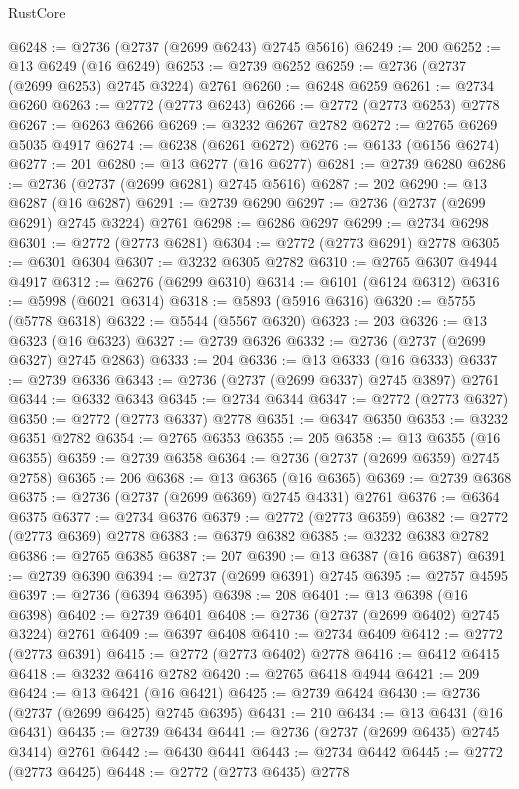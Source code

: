 \begin{lexlean}{RustCore}
\begin{coremodule}
@6248 := @2736 (@2737 (@2699 @6243) @2745 @5616)
@6249 := 200
@6252 := @13 @6249 (@16 @6249)
@6253 := @2739 @6252
@6259 := @2736 (@2737 (@2699 @6253) @2745 @3224) @2761
@6260 := @6248 @6259
@6261 := @2734 @6260
@6263 := @2772 (@2773 @6243)
@6266 := @2772 (@2773 @6253) @2778
@6267 := @6263 @6266
@6269 := @3232 @6267 @2782
@6272 := @2765 @6269 @5035 @4917
@6274 := @6238 (@6261 @6272)
@6276 := @6133 (@6156 @6274)
@6277 := 201
@6280 := @13 @6277 (@16 @6277)
@6281 := @2739 @6280
@6286 := @2736 (@2737 (@2699 @6281) @2745 @5616)
@6287 := 202
@6290 := @13 @6287 (@16 @6287)
@6291 := @2739 @6290
@6297 := @2736 (@2737 (@2699 @6291) @2745 @3224) @2761
@6298 := @6286 @6297
@6299 := @2734 @6298
@6301 := @2772 (@2773 @6281)
@6304 := @2772 (@2773 @6291) @2778
@6305 := @6301 @6304
@6307 := @3232 @6305 @2782
@6310 := @2765 @6307 @4944 @4917
@6312 := @6276 (@6299 @6310)
@6314 := @6101 (@6124 @6312)
@6316 := @5998 (@6021 @6314)
@6318 := @5893 (@5916 @6316)
@6320 := @5755 (@5778 @6318)
@6322 := @5544 (@5567 @6320)
@6323 := 203
@6326 := @13 @6323 (@16 @6323)
@6327 := @2739 @6326
@6332 := @2736 (@2737 (@2699 @6327) @2745 @2863)
@6333 := 204
@6336 := @13 @6333 (@16 @6333)
@6337 := @2739 @6336
@6343 := @2736 (@2737 (@2699 @6337) @2745 @3897) @2761
@6344 := @6332 @6343
@6345 := @2734 @6344
@6347 := @2772 (@2773 @6327)
@6350 := @2772 (@2773 @6337) @2778
@6351 := @6347 @6350
@6353 := @3232 @6351 @2782
@6354 := @2765 @6353
@6355 := 205
@6358 := @13 @6355 (@16 @6355)
@6359 := @2739 @6358
@6364 := @2736 (@2737 (@2699 @6359) @2745 @2758)
@6365 := 206
@6368 := @13 @6365 (@16 @6365)
@6369 := @2739 @6368
@6375 := @2736 (@2737 (@2699 @6369) @2745 @4331) @2761
@6376 := @6364 @6375
@6377 := @2734 @6376
@6379 := @2772 (@2773 @6359)
@6382 := @2772 (@2773 @6369) @2778
@6383 := @6379 @6382
@6385 := @3232 @6383 @2782
@6386 := @2765 @6385
@6387 := 207
@6390 := @13 @6387 (@16 @6387)
@6391 := @2739 @6390
@6394 := @2737 (@2699 @6391) @2745
@6395 := @2757 @4595
@6397 := @2736 (@6394 @6395)
@6398 := 208
@6401 := @13 @6398 (@16 @6398)
@6402 := @2739 @6401
@6408 := @2736 (@2737 (@2699 @6402) @2745 @3224) @2761
@6409 := @6397 @6408
@6410 := @2734 @6409
@6412 := @2772 (@2773 @6391)
@6415 := @2772 (@2773 @6402) @2778
@6416 := @6412 @6415
@6418 := @3232 @6416 @2782
@6420 := @2765 @6418 @4944
@6421 := 209
@6424 := @13 @6421 (@16 @6421)
@6425 := @2739 @6424
@6430 := @2736 (@2737 (@2699 @6425) @2745 @6395)
@6431 := 210
@6434 := @13 @6431 (@16 @6431)
@6435 := @2739 @6434
@6441 := @2736 (@2737 (@2699 @6435) @2745 @3414) @2761
@6442 := @6430 @6441
@6443 := @2734 @6442
@6445 := @2772 (@2773 @6425)
@6448 := @2772 (@2773 @6435) @2778

\end{coremodule}
\end{lexlean}
